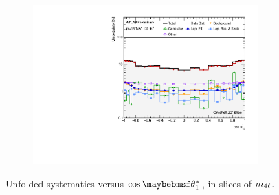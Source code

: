 \begin{figure}[hp]
    \begin{subfigure}{.49\textwidth}\centering\includegraphics[width = 0.95\textwidth]{Figures/m4l/Systematics/Unfolded/UnfoldedSys_CTS12_vs_M4l_Stack_Paper3.pdf}\end{subfigure}
    \caption{Unfolded systematics versus $\costhetastar_{1}$, in slices of $m_{4\ell}$.}
\end{figure}

